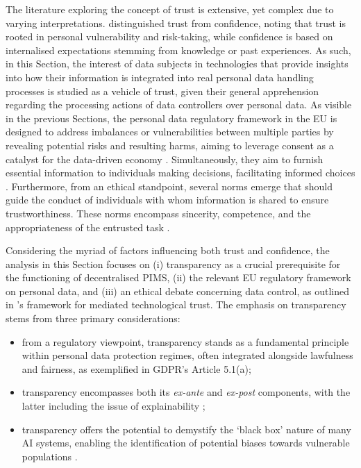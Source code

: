 The literature exploring the concept of trust is extensive, yet complex due to varying interpretations.
\cite{de_filippi_blockchain_2020} distinguished trust from confidence, noting that trust is rooted in personal vulnerability and risk-taking, while confidence is based on internalised expectations stemming from knowledge or past experiences.
As such, in this Section, the interest of data subjects in technologies that provide insights into how their information is integrated into real personal data handling processes is studied as a vehicle of trust, given their general apprehension regarding the processing actions of data controllers over personal data.
As visible in the previous Sections, the personal data regulatory framework in the EU is designed to address imbalances or vulnerabilities between multiple parties by revealing potential risks and resulting harms, aiming to leverage consent as a catalyst for the data-driven economy \citep{chomczyk_penedo_towards_2022}. 
Simultaneously, they aim to furnish essential information to individuals making decisions, facilitating informed choices \cite{pbenshahar_more_2014}.
Furthermore, from an ethical standpoint, several norms emerge that should guide the conduct of individuals with whom information is shared to ensure trustworthiness.
These norms encompass sincerity, competence, and the appropriateness of the entrusted task \citep{hawley_how_2019}.

Considering the myriad of factors influencing both trust and confidence, the analysis in this Section focuses on (i) transparency as a crucial prerequisite for the functioning of decentralised PIMS, (ii) the relevant EU regulatory framework on personal data, and (iii) an ethical debate concerning data control, as outlined in \citeauthor{bodo_mediated_2021}'s framework for mediated technological trust.
The emphasis on transparency stems from three primary considerations:
\begin{itemize}
    \item from a regulatory viewpoint, transparency stands as a fundamental principle within personal data protection regimes, often integrated alongside lawfulness and fairness, as exemplified in GDPR's Article 5.1(a);
    \item transparency encompasses both its \textit{ex-ante} and \textit{ex-post} components, with the latter including the issue of explainability \citep{felzmann_transparency_2019};
    \item transparency offers the potential to demystify the `black box' nature of many AI systems, enabling the identification of potential biases towards vulnerable populations \citep{pasquale_black_2015}.
\end{itemize}

